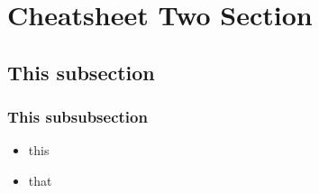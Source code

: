 \section{Cheatsheet Two Section}

\subsection{This subsection}

\subsubsection{This subsubsection}

\begin{itemize}
\item this
\item that
\end{itemize}


